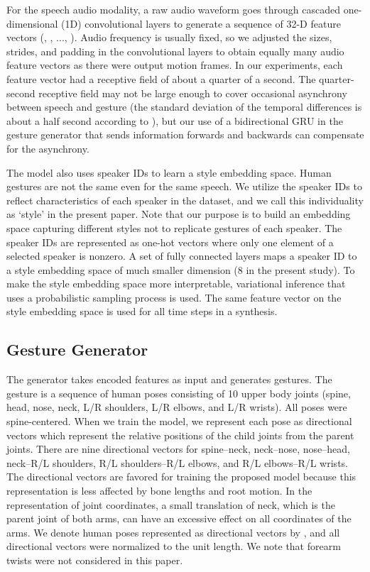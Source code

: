 \documentclass[acmtog]{acmart}
\begin{document}
For the speech audio modality, a raw audio waveform goes through cascaded one-dimensional (1D) convolutional layers to generate a sequence of 32-D feature vectors (, , ..., ). Audio frequency is usually fixed, so we adjusted the sizes, strides, and padding in the convolutional layers to obtain equally many audio feature vectors as there were output motion frames. In our experiments, each feature vector had a receptive field of about a quarter of a second. The quarter-second receptive field may not be large enough to cover occasional asynchrony between speech and gesture (the standard deviation of the temporal
differences is about a half second according to \cite{bergmann2011relation}), but our use of a bidirectional GRU in the gesture generator that sends information forwards and backwards can compensate for the asynchrony.

The model also uses speaker IDs to learn a style embedding space. Human gestures are not the same even for the same speech. We utilize the speaker IDs to reflect characteristics of each speaker in the dataset, and we call this individuality as `style' in the present paper. Note that our purpose is to build an embedding space capturing different styles not to replicate gestures of each speaker. The speaker IDs are represented as one-hot vectors where only one element of a selected speaker is nonzero. A set of fully connected layers maps a speaker ID to a style embedding space of much smaller dimension (8 in the present study). To make the style embedding space more interpretable, variational inference \cite{kingma2013auto, rezende2014stochastic} that uses a probabilistic sampling process is used. The same feature vector  on the style embedding space is used for all time steps in a synthesis.

\subsection{Gesture Generator}
The generator  takes encoded features as input and generates gestures. The gesture is a sequence of human poses  consisting of 10 upper body joints (spine, head, nose, neck, L/R shoulders, L/R elbows, and L/R wrists). All poses were spine-centered. When we train the model, we represent each pose as directional vectors which represent the relative positions of the child joints from the parent joints. There are nine directional vectors for spine--neck, neck--nose, nose--head, neck--R/L shoulders, R/L shoulders--R/L elbows, and R/L elbows--R/L wrists. The directional vectors are favored for training the proposed model because this representation is less affected by bone lengths and root motion. In the representation of joint coordinates, a small translation of neck, which is the parent joint of both arms, can have an excessive effect on all coordinates of the arms. We denote human poses represented as directional vectors by , and all directional vectors were normalized to the unit length. We note that forearm twists were not considered in this paper.
\end{document}
